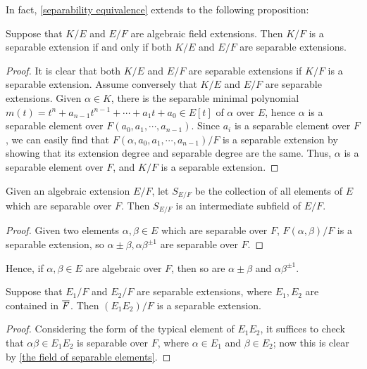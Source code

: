 In fact, \cref{separability equivalence} extends to the following proposition:
\begin{prop}
    Suppose that $K/E$ and $E/F$ are algebraic field extensions.
    Then $K/F$ is a separable extension if and only if both $K/E$ and $E/F$ are separable extensions.
\end{prop}
\begin{proof}
    It is clear that both $K/E$ and $E/F$ are separable extensions if $K/F$ is a separable extension.
    Assume conversely that $K/E$ and $E/F$ are separable extensions.
    Given $\alpha\in K$, there is the separable minimal polynomial $m(t)=t^n+a_{n-1}t^{n-1}+\cdots+a_1t+a_0\in E[t]$ of $\alpha$ over $E$, hence $\alpha$ is a separable element over $F(a_0, a_1, \cdots, a_{n-1})$.
    Since $a_i$ is a separable element over $F$, we can easily find that $F(\alpha, a_0, a_1, \cdots, a_{n-1})/F$ is a separable extension by showing that its extension degree and separable degree are the same.
    Thus, $\alpha$ is a separable element over $F$, and $K/F$ is a separable extension.
\end{proof}
\begin{cor}\label{the field of separable elements}
    Given an algebraic extension $E/F$, let $S_{E/F}$ be the collection of all elements of $E$ which are separable over $F$.
    Then $S_{E/F}$ is an intermediate subfield of $E/F$.
\end{cor}
\begin{proof}
    Given two elements $\alpha, \beta\in E$ which are separable over $F$, $F(\alpha, \beta)/F$ is a separable extension, so $\alpha\pm\beta, \alpha\beta^{\pm 1}$ are separable over $F$.
\end{proof}
\begin{rmk}
    Hence, if $\alpha, \beta\in E$ are algebraic over $F$, then so are $\alpha\pm\beta$ and $\alpha\beta^{\pm 1}$.
\end{rmk}

\begin{prop}
    Suppose that $E_1/F$ and $E_2/F$ are separable extensions, where $E_1, E_2$ are contained in $\overline{F}$.
    Then $(E_1E_2)/F$ is a separable extension.
\end{prop}
\begin{proof}
    Considering the form of the typical element of $E_1E_2$, it suffices to check that $\alpha\beta\in E_1E_2$ is separable over $F$, where $\alpha\in E_1$ and $\beta\in E_2$; now this is clear by \cref{the field of separable elements}.
\end{proof}

